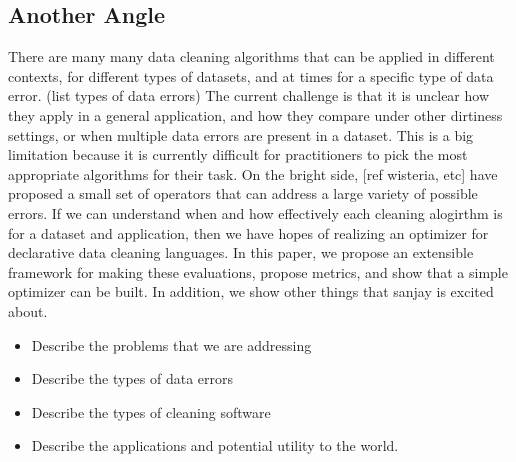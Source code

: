 \subsection{Another Angle}

There are many many data cleaning algorithms that can be applied in different contexts, for different types of datasets, and at times for a specific type of data error.  (list types of data errors)   The current challenge is that it is unclear how they apply in a general application, and how they compare under other dirtiness settings, or when multiple data errors are present in a dataset.  This is a big limitation because it is currently difficult for practitioners to pick the most appropriate algorithms for their task.    On the bright side, [ref wisteria, etc] have proposed a small set of operators that can address a large variety of possible errors.  If we can understand when and how effectively each cleaning alogirthm is for a dataset and application, then we have hopes of realizing an optimizer for declarative data cleaning languages.  In this paper, we propose an extensible framework for making these evaluations, propose metrics, and show that a simple optimizer can be built.  In addition, we show other things that sanjay is excited about.


\begin{itemize}
    \item Describe the problems that we are addressing
    \item Describe the types of data errors
    \item Describe the types of cleaning software
    \item Describe the applications and potential utility to the world.
\end{itemize}

